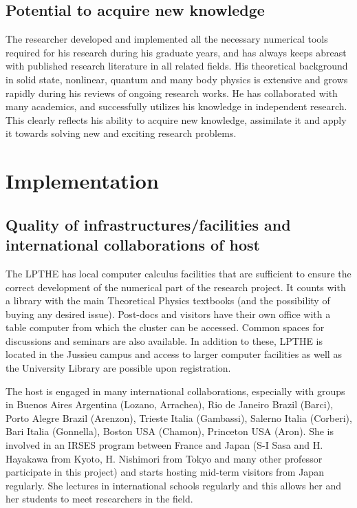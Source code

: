 \documentclass[a4paper,11pt,color]{article}
\begin{document}
\subsection{Potential to acquire new knowledge}
\label{sec:potential_knowledge}
The researcher developed and implemented all the necessary numerical tools required for his research during his graduate years, and has always keeps abreast with published research literature in all related fields. His theoretical background in solid state, nonlinear, quantum and many body physics is extensive and grows rapidly during his reviews of ongoing research works. He has collaborated with many academics, and successfully utilizes his knowledge in independent research. This clearly reflects his ability to acquire new knowledge, assimilate it and apply it towards solving new and exciting research problems.
  
\newpage
\section{Implementation}
\label{sec:implementation}


\subsection{Quality of infrastructures/facilities and international
  collaborations of host}
\label{sec:facilities}

 {
The LPTHE has local computer calculus facilities that are sufficient to ensure the 
correct development of the numerical part of the research project. It 
counts with a library with the main Theoretical Physics textbooks
(and the possibility of buying any desired issue). Post-docs and 
visitors have their own office with a table computer from which the cluster can be 
accessed. Common spaces for discussions and 
seminars are also available. In addition to these, LPTHE is located
in the Jussieu campus and access to larger computer facilities
as well as the University Library are possible upon registration. 
}

 {
The host is engaged in many international collaborations, especially with groups in 
Buenos Aires Argentina (Lozano, Arrachea), Rio de Janeiro Brazil (Barci), Porto Alegre Brazil
(Arenzon), Trieste Italia (Gambassi), Salerno Italia (Corberi), Bari Italia (Gonnella), Boston USA
(Chamon), Princeton USA (Aron). She is involved in an IRSES program between France
and Japan (S-I Sasa and H. Hayakawa from Kyoto, H. Nishimori from Tokyo and many other
professor participate in this project) 
and starts hosting mid-term visitors from Japan regularly. She lectures in international 
schools regularly and this allows her and her students to meet researchers in the field.
}
\end{document}
